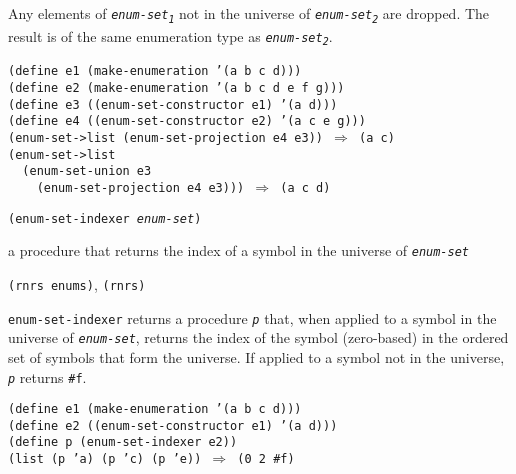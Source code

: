 Any elements of \texttt{\textit{enum-set\textsubscript{1}}} not in the universe of \texttt{\textit{enum-set\textsubscript{2}}} are dropped.
The result is of the same enumeration type as \texttt{\textit{enum-set\textsubscript{2}}}.


\begin{alltt}
(define e1 (make-enumeration '(a b c d)))
(define e2 (make-enumeration '(a b c d e f g)))
(define e3 ((enum-set-constructor e1) '(a d)))
(define e4 ((enum-set-constructor e2) '(a c e g)))
(enum-set-\textgreater{}list (enum-set-projection e4 e3)) \(\Rightarrow\) (a c)
(enum-set-\textgreater{}list
  (enum-set-union e3
    (enum-set-projection e4 e3))) \(\Rightarrow\) (a c d)
\end{alltt}

\begin{description}

\label{objects_s301}\item[procedure] \texttt{(enum-set-indexer \textit{enum-set})}



\item[returns] a procedure that returns the index of a symbol in the universe of \texttt{\textit{enum-set}}


\item[libraries] \texttt{(rnrs enums)}, \texttt{(rnrs)}
\end{description}

\texttt{enum-set-indexer} returns a procedure \texttt{\textit{p}} that, when applied to a symbol
in the universe of \texttt{\textit{enum-set}}, returns the index of the symbol (zero-based) in
the ordered set of symbols that form the universe.
If applied to a symbol not in the universe, \texttt{\textit{p}} returns \texttt{\#{}f}.

\begin{alltt}
(define e1 (make-enumeration '(a b c d)))
(define e2 ((enum-set-constructor e1) '(a d)))
(define p (enum-set-indexer e2))
(list (p 'a) (p 'c) (p 'e)) \(\Rightarrow\) (0 2 \#{}f)
\end{alltt}



